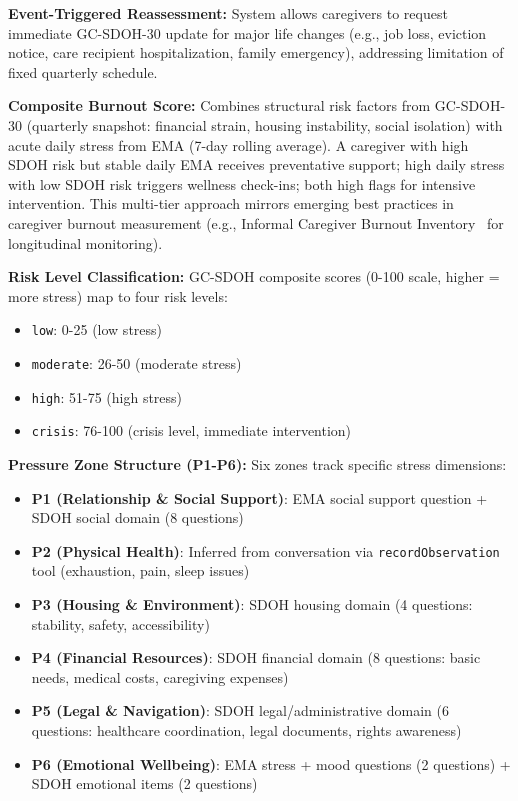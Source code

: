 \documentclass{article}
\begin{document}
\textbf{Event-Triggered Reassessment:} System allows caregivers to request immediate GC-SDOH-30 update for major life changes (e.g., job loss, eviction notice, care recipient hospitalization, family emergency), addressing limitation of fixed quarterly schedule.

\textbf{Composite Burnout Score:} Combines structural risk factors from GC-SDOH-30 (quarterly snapshot: financial strain, housing instability, social isolation) with acute daily stress from EMA (7-day rolling average). A caregiver with high SDOH risk but stable daily EMA receives preventative support; high daily stress with low SDOH risk triggers wellness check-ins; both high flags for intensive intervention. This multi-tier approach mirrors emerging best practices in caregiver burnout measurement (e.g., Informal Caregiver Burnout Inventory~\cite{icbi2020} for longitudinal monitoring).

\textbf{Risk Level Classification:} GC-SDOH composite scores (0-100 scale, higher = more stress) map to four risk levels:
\begin{itemize}
    \item \texttt{low}: 0-25 (low stress)
    \item \texttt{moderate}: 26-50 (moderate stress)
    \item \texttt{high}: 51-75 (high stress)
    \item \texttt{crisis}: 76-100 (crisis level, immediate intervention)
\end{itemize}

\textbf{Pressure Zone Structure (P1-P6):} Six zones track specific stress dimensions:
\begin{itemize}
    \item \textbf{P1 (Relationship \& Social Support)}: EMA social support question + SDOH social domain (8 questions)
    \item \textbf{P2 (Physical Health)}: Inferred from conversation via \texttt{recordObservation} tool (exhaustion, pain, sleep issues)
    \item \textbf{P3 (Housing \& Environment)}: SDOH housing domain (4 questions: stability, safety, accessibility)
    \item \textbf{P4 (Financial Resources)}: SDOH financial domain (8 questions: basic needs, medical costs, caregiving expenses)
    \item \textbf{P5 (Legal \& Navigation)}: SDOH legal/administrative domain (6 questions: healthcare coordination, legal documents, rights awareness)
    \item \textbf{P6 (Emotional Wellbeing)}: EMA stress + mood questions (2 questions) + SDOH emotional items (2 questions)
\end{itemize}
\end{document}
